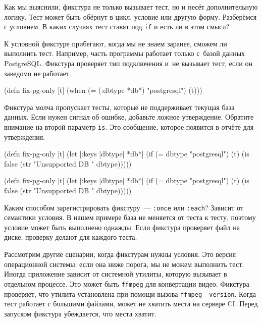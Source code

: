 
Как мы выяснили, фикстура не только вызывает тест, но и несёт дополнительную
логику. Тест может быть обёрнут в цикл, условие или другую форму. Разберёмся с
условием. В каких случаях тест ставят под \verb|if| и есть ли в этом смысл?

К условной фикстуре прибегают, когда мы не знаем заранее, сможем ли выполнить
тест. Например, часть программы работает только с~базой данных
PostgreSQL. Фикстура проверяет тип подключения и~не вызывает тест, если он
заведомо не работает.

\begin{english}
  \begin{clojure}
(defn fix-pg-only [t]
  (when (= (:dbtype *db*) "postgresql")
    (t)))
  \end{clojure}
\end{english}

Фикстура молча пропускает тесты, которые не поддерживает текущая база
данных. Если нужен сигнал об ошибке, добавьте ложное утверждение. Обратите
внимание на второй параметр \verb|is|. Это сообщение, которое появится в отчёте
для утверждения.

\ifx\DEVICETYPE\MOBILE

\begin{english}
  \begin{clojure}
(defn fix-pg-only [t]
  (let [{:keys [dbtype]} *db*]
    (if (= dbtype "postgresql")
      (t)
      (is false
        (str "Unsupported DB "
          dbtype)))))
  \end{clojure}
\end{english}

\else

\begin{english}
  \begin{clojure}
(defn fix-pg-only [t]
  (let [{:keys [dbtype]} *db*]
    (if (= dbtype "postgresql")
      (t)
      (is false (str "Unsupported DB " dbtype)))))
  \end{clojure}
\end{english}

\fi

Каким способом зарегистрировать фикстуру~--- \verb|:once| или \verb|:each|?
Зависит от семантики условия. В нашем примере база не меняется от теста к тесту,
поэтому условие может быть выполнено однажды. Если фикстура проверяет файл на
диске, проверку делают для каждого теста.

Рассмотрим другие сценарии, когда фикстурам нужны условия. Это версия
операционной системы: если она ниже порога, мы не можем выполнить тест. Иногда
приложение зависит от системной утилиты, которую вызывает в отдельном
процессе. Это может быть \verb|ffmpeg| для конвертации видео. Фикстура
проверяет, что утилита установлена при помощи вызова \verb|ffmpeg -version|.
Когда тест работает с большими файлами, может не хватить места на сервере
CI. Перед запуском фикстура убеждается, что места хватит.

